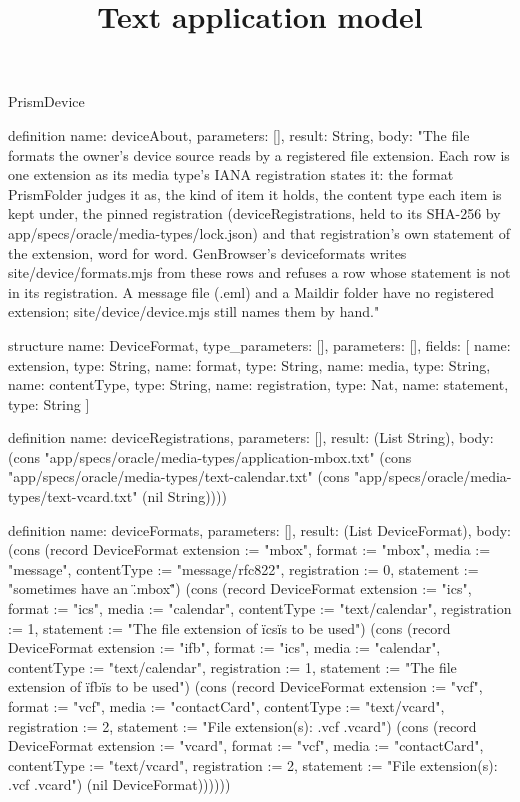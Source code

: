 \begin{lexlean}{PrismDevice}
\title{Text application model}
\begin{semanticmodule}
definition{
  name: deviceAbout,
  parameters: [],
  result: String,
  body: "The file formats the owner's device source reads by a registered file extension. Each row is one extension as its media type's IANA registration states it: the format PrismFolder judges it as, the kind of item it holds, the content type each item is kept under, the pinned registration (deviceRegistrations, held to its SHA-256 by app/specs/oracle/media-types/lock.json) and that registration's own statement of the extension, word for word. GenBrowser's deviceformats writes site/device/formats.mjs from these rows and refuses a row whose statement is not in its registration. A message file (.eml) and a Maildir folder have no registered extension; site/device/device.mjs still names them by hand."
}

structure{
  name: DeviceFormat,
  type_parameters: [],
  parameters: [],
  fields: [
    {name: extension, type: String},
    {name: format, type: String},
    {name: media, type: String},
    {name: contentType, type: String},
    {name: registration, type: Nat},
    {name: statement, type: String}
  ]
}

definition{
  name: deviceRegistrations,
  parameters: [],
  result: (List String),
  body: (cons "app/specs/oracle/media-types/application-mbox.txt" (cons "app/specs/oracle/media-types/text-calendar.txt" (cons "app/specs/oracle/media-types/text-vcard.txt" (nil String))))
}

definition{
  name: deviceFormats,
  parameters: [],
  result: (List DeviceFormat),
  body: (cons (record DeviceFormat {extension := "mbox", format := "mbox", media := "message", contentType := "message/rfc822", registration := 0, statement := "sometimes have an \".mbox\""}) (cons (record DeviceFormat {extension := "ics", format := "ics", media := "calendar", contentType := "text/calendar", registration := 1, statement := "The file extension of \"ics\" is to be used"}) (cons (record DeviceFormat {extension := "ifb", format := "ics", media := "calendar", contentType := "text/calendar", registration := 1, statement := "The file extension of \"ifb\" is to be used"}) (cons (record DeviceFormat {extension := "vcf", format := "vcf", media := "contactCard", contentType := "text/vcard", registration := 2, statement := "File extension(s):  .vcf .vcard"}) (cons (record DeviceFormat {extension := "vcard", format := "vcf", media := "contactCard", contentType := "text/vcard", registration := 2, statement := "File extension(s):  .vcf .vcard"}) (nil DeviceFormat))))))
}


\end{semanticmodule}
\end{lexlean}
